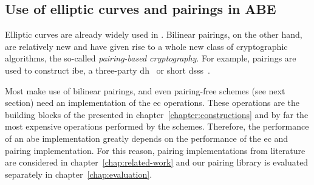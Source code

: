 \subsection{Use of elliptic curves and pairings in ABE}
Elliptic curves are already widely used in .
Bilinear pairings, on the other hand, are relatively new and have given rise to a whole new class of cryptographic algorithms, the so-called \emph{pairing-based cryptography}.
For example, pairings are used to construct \gls{ibe}, a three-party \gls{dh}~\cite{joux_one_2000} or short \glspl{dss}~\cite{boneh_short_2001}.

Most  make use of bilinear pairings, and even pairing-free schemes (see next section) need an implementation of the \gls{ec} operations.
These operations are the building blocks of the  presented in chapter~\ref{chapter:constructions} and by far the most expensive operations performed by the schemes.
Therefore, the performance of an \acrshort{abe} implementation greatly depends on the performance of the \gls{ec} and pairing implementation.
For this reason, pairing implementations from literature are considered in chapter~\ref{chap:related-work} and our pairing library is evaluated separately in chapter~\ref{chap:evaluation}.